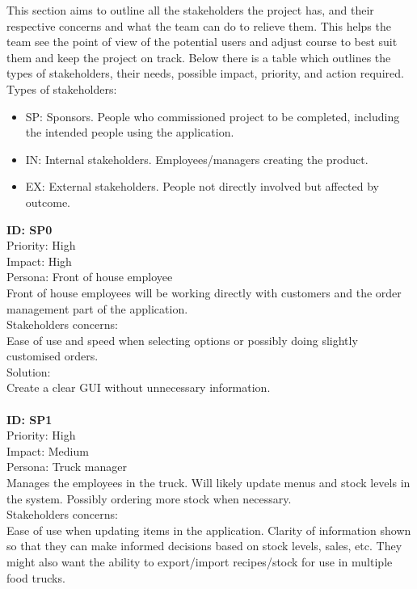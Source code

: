 
This section aims to outline all the stakeholders the project has, and their respective concerns and what the team can do to relieve them. This helps the team see the point of view of the potential users and adjust course to best suit them and keep the project on track. Below there is a table which outlines the types of stakeholders, their needs, possible impact, priority, and action required. \\
Types of stakeholders: \\
\begin{itemize}
	\item SP: Sponsors. People who commissioned project to be completed, including the intended people using the application. 
	\item IN: Internal stakeholders. Employees/managers creating the product. 
	\item EX: External stakeholders. People not directly involved but affected by outcome.\\
\end{itemize}
\textbf{ID: SP0\\}
Priority: High\\
Impact: High\\
Persona: Front of house employee\\
Front of house employees will be working directly with customers and the order management part of the application.\\
Stakeholders concerns: \\
Ease of use and speed when selecting options or possibly doing slightly customised orders.\\
Solution:\\
Create a clear GUI without unnecessary information.\\
\\
\textbf{ID: SP1\\}
Priority: High\\
Impact: Medium\\
Persona: Truck manager\\
Manages the employees in the truck. Will likely update menus and stock levels in the system. Possibly ordering more stock when necessary.\\
Stakeholders concerns:\\
Ease of use when updating items in the application. Clarity of information shown so that they can make informed decisions based on stock levels, sales, etc. They might also want the ability to export/import recipes/stock for use in multiple food trucks.\\

